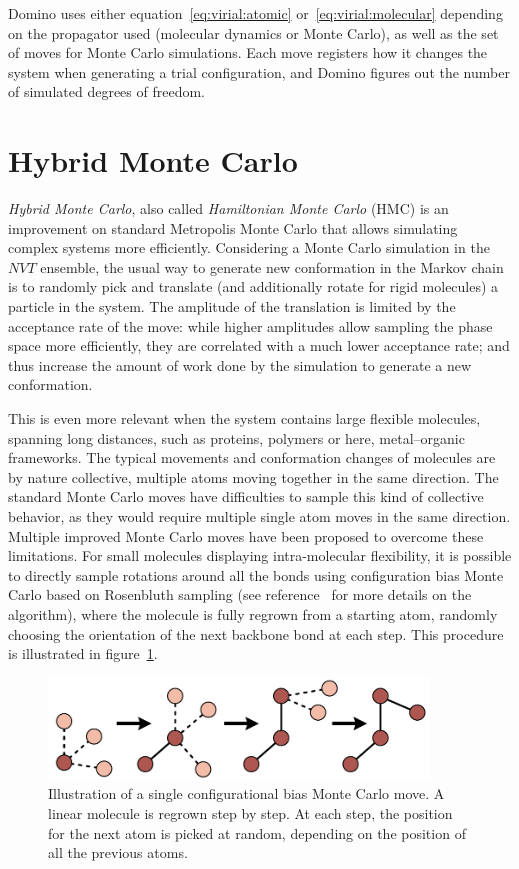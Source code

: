 \documentclass[thesis]{subfiles}
\begin{document}
Domino uses either equation~\eqref{eq:virial:atomic}
or~\eqref{eq:virial:molecular} depending on the propagator used (molecular
dynamics or Monte Carlo), as well as the set of moves for Monte Carlo
simulations. Each move registers how it changes the system when generating a
trial configuration, and Domino figures out the number of simulated degrees of
freedom.

\newpage
\section{Hybrid Monte Carlo}
\label{sec:hmc}

\emph{Hybrid Monte Carlo}, also called \emph{Hamiltonian Monte Carlo} (HMC) is
an improvement on standard Metropolis Monte Carlo that allows simulating
complex systems more efficiently. Considering a Monte Carlo simulation in the
$NVT$ ensemble, the usual way to generate new conformation in the Markov chain
is to randomly pick and translate (and additionally rotate for rigid molecules)
a particle in the system. The amplitude of the translation is limited by the
acceptance rate of the move: while higher amplitudes allow sampling the phase
space more efficiently, they are correlated with a much lower acceptance rate;
and thus increase the amount of work done by the simulation to generate a new
conformation.

This is even more relevant when the system contains large flexible molecules,
spanning long distances, such as proteins, polymers or here, metal--organic
frameworks. The typical movements and conformation changes of molecules are
by nature collective, multiple atoms moving together in the same direction. The
standard Monte Carlo moves have difficulties to sample this kind of collective
behavior, as they would require multiple single atom moves in the same
direction. Multiple improved Monte Carlo moves have been proposed to overcome
these limitations. For small molecules displaying intra-molecular flexibility,
it is possible to directly sample rotations around all the bonds using
configuration bias Monte Carlo based on Rosenbluth sampling (see
reference~\cite{Frenkel2002} for more details on the algorithm), where the
molecule is fully regrown from a starting atom, randomly choosing the
orientation of the next backbone bond at each step. This procedure is
illustrated in figure~\ref{fig:cbmc}.

\begin{figure}[ht]
    \centering
    \includegraphics[width=0.9\textwidth]{figures/images/cbmc}
    \caption{Illustration of a single configurational bias Monte Carlo move. A
    linear molecule is regrown step by step. At each step, the position for the
    next atom is picked at random, depending on the position of all the
    previous atoms.}
    \label{fig:cbmc}
\end{figure}
\end{document}
